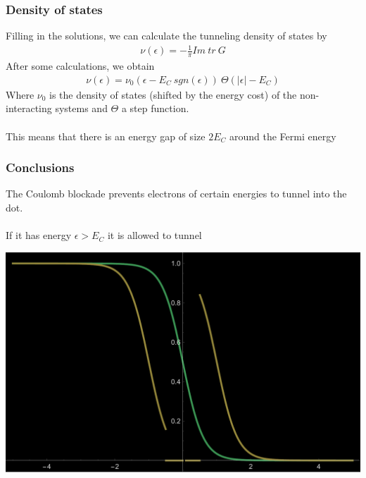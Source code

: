 \documentclass[]{beamer}
\begin{document}
\begin{frame}[t]\frametitle{Density of states}
  Filling in the solutions, we can calculate the tunneling density of states by
  \begin{align*}
    \nu(\epsilon) = - \frac{1}{\pi} Im~tr~G
  \end{align*}
  After some calculations, we obtain
  \begin{align*}
    \nu(\epsilon) = \nu_0(\epsilon - E_C ~ sgn(\epsilon)) ~ \Theta(|\epsilon| - E_C)
  \end{align*}
  Where $\nu_0$ is the density of states (shifted by the energy cost) of the non-interacting systems and $\Theta$ a step function.\\
  ~\\
  This means that there is an energy gap of size $2 E_C$ around the Fermi energy


\end{frame}

\begin{frame}[t]\frametitle{Conclusions}
  The Coulomb blockade prevents electrons of certain energies to tunnel into the dot. \\
  ~\\
  If it has energy $\epsilon > E_C$ it is allowed to tunnel

  \includegraphics[scale=0.35]{plt_fd}
\end{frame}
\end{document}
